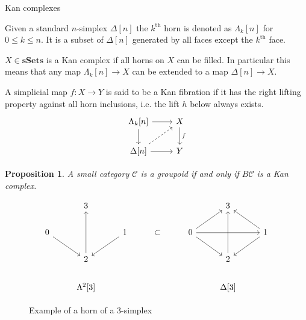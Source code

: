 \documentclass[10pt]{beamer}
\newcounter{dummy} \numberwithin{dummy}{section}
\newtheorem{proposition}[dummy]{Proposition}
\begin{document}
\begin{frame}{Kan complexes}
	\begin{definition}
		Given a standard $n$-simplex $\Delta[n]$ the $k^\text{th}$ horn is denoted as $\Lambda_k[n]$ for $0 \leq k \leq n$. It is a subset of $\Delta[n]$ generated by all faces except the $k^\text{th}$ face.
	\end{definition}
	
	
	
	
	\begin{definition}
		$X \in \mathbf{sSets}$ is a Kan complex if all horns on $X$ can be filled. In particular this means that any map $\Lambda_k[n] \to X$ can be extended to a map $\Delta[n] \to X$.
	\end{definition}
	
	\begin{definition}
		A simplicial map \( f: X\to Y \) is said to be a Kan fibration if it has the right lifting property against all horn inclusions, i.e. the lift \( h \) below always exists.
		\[\begin{tikzcd}
			{\Lambda_k[n]} & X \\
			{\Delta[n]} & Y
			\arrow[from=1-1, to=1-2]
			\arrow[from=1-1, to=2-1]
			\arrow["f", from=1-2, to=2-2]
			\arrow[dashed, from=2-1, to=1-2]
			\arrow[from=2-1, to=2-2]
		\end{tikzcd}\]
	\end{definition}
		\begin{proposition}
		A small category $\mathcal{C}$ is a groupoid if and only if $B\mathcal{C}$ is a Kan complex.
	\end{proposition}
	
	\begin{figure}[!htb]
		\centering
		\[\begin{tikzcd}
			& 3 &&&& 3 \\
			0 && 1 & \subset & 0 && 1 \\
			& 2 &&&& 2 \\
			& {\Lambda^2[3]} &&&& {\Delta[3]}
			\arrow[from=2-1, to=3-2]
			\arrow[from=2-3, to=3-2]
			\arrow[from=2-5, to=1-6]
			\arrow[from=2-5, to=2-7]
			\arrow[from=2-5, to=3-6]
			\arrow[from=2-7, to=1-6]
			\arrow[from=2-7, to=3-6]
			\arrow[from=3-2, to=1-2]
			\arrow[from=3-6, to=1-6]
		\end{tikzcd}\]
		\caption{Example of a horn of a $3$-simplex}
		\label{fig:horn}
	\end{figure}
\end{frame}
\end{document}

